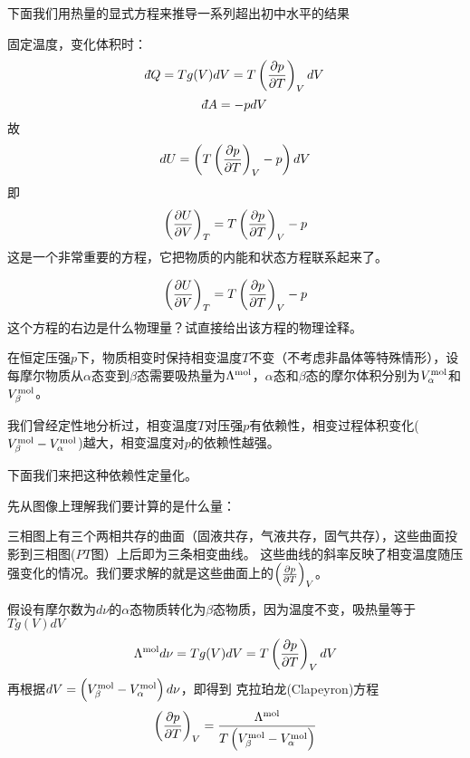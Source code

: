 \documentclass[CJK]{beamer}
\begin{document}
\begin{frame}
\bch

下面我们用热量的显式方程来推导一系列超出初中水平的结果

\ech
\end{frame}


\begin{frame}
\bch
固定温度，变化体积时：
$$\dbar Q = T g(V)dV = T\pfrac pTV dV$$
$$\dbar A = -pdV$$
故
$$dU = \left(T \left(\frac{\partial p}{\partial T}\right)_{V} - p\right)dV$$
即{\blue
$$\left(\frac{\partial U}{\partial V}\right)_{T} = T \left(\frac{\partial p}{\partial T}\right)_{V} - p$$
}
这是一个非常重要的方程，它把物质的内能和状态方程联系起来了。
\ech
\end{frame}

\begin{frame}
\bch

$$\left(\frac{\partial U}{\partial V}\right)_{T} = T \left(\frac{\partial p}{\partial T}\right)_{V} - p$$
这个方程的右边是什么物理量？试直接给出该方程的物理诠释。

\ech
\end{frame}


\begin{frame}
\bch
{\small

在恒定压强$p$下，物质相变时保持相变温度$T$不变（不考虑非晶体等特殊情形），设每摩尔物质从$\alpha$态变到$\beta$态需要吸热量为$\Lambda^{\rm mol}$，$\alpha$态和$\beta$态的摩尔体积分别为$V_\alpha^{\rm mol}$和$V_\beta^{\rm mol}$。

\skipline

我们曾经定性地分析过，相变温度$T$对压强$p$有依赖性，相变过程体积变化($V_\beta^{\rm mol}-V_\alpha^{\rm mol}$)越大，相变温度对$p$的依赖性越强。

\skipline

下面我们来把这种依赖性定量化。
}
\ech
\end{frame}


\begin{frame}
\bch
先从图像上理解我们要计算的是什么量：

\hspace{0.1in}

三相图上有三个两相共存的曲面（固液共存，气液共存，固气共存），这些曲面投影到三相图($PT$图）上后即为三条相变曲线。
这些曲线的斜率反映了相变温度随压强变化的情况。我们要求解的就是这些曲面上的$\left(\frac{\partial p}{\partial T}\right)_{V}$。
\ech
\end{frame}


\begin{frame}
\bch
假设有摩尔数为$d\nu$的$\alpha$态物质转化为$\beta$态物质，因为温度不变，吸热量等于$Tg(V)dV$
$$ \Lambda^{\rm mol} d\nu = Tg(V)dV = T\left(\frac{\partial p}{\partial T}\right)_{V} dV $$
再根据$dV = \left(V_\beta^{\rm mol} - V_\alpha^{\rm mol}\right)d\nu$，即得到
{\blue 克拉珀龙(Clapeyron)方程
$$ \left(\frac{\partial p}{\partial T}\right)_{V} = \frac{\Lambda^{\rm mol}}{T\left(V_\beta^{\rm mol} - V_\alpha^{\rm mol}\right)}$$}
\ech
\end{frame}
\end{document}
